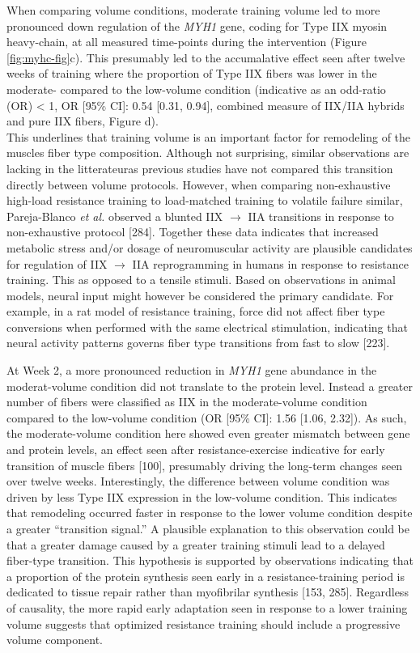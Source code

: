 \documentclass[twoside,10pt]{gihclass} %
\begin{document}
When comparing volume conditions, moderate training volume led to more pronounced down regulation of the \emph{MYH1} gene, coding for Type IIX myosin heavy-chain, at all measured time-points during the intervention (Figure \ref{fig:myhc-fig}c). This presumably led to the accumalative effect seen after twelve weeks of training where the proportion of Type IIX fibers was lower in the moderate- compared to the low-volume condition (indicative as an odd-ratio (OR) \textless{} 1, OR {[}95\% CI{]}: 0.54 {[}0.31, 0.94{]}, combined measure of IIX/IIA hybrids and pure IIX fibers, Figure d).\\
This underlines that training volume is an important factor for remodeling of the muscles fiber type composition. Although not surprising, similar observations are lacking in the litterateuras previous studies have not compared this transition directly between volume protocols.
However, when comparing non-exhaustive high-load resistance training to load-matched training to volatile failure similar, Pareja-Blanco \emph{et al.} observed a blunted IIX \(\rightarrow\) IIA transitions in response to non-exhaustive protocol
{[}284{]}.
Together these data indicates that increased metabolic stress and/or dosage of neuromuscular activity are plausible candidates for regulation of IIX \(\rightarrow\) IIA reprogramming in humans in response to resistance training.
This as opposed to a tensile stimuli.
Based on observations in animal models, neural input might however be considered the primary candidate.
For example, in a rat model of resistance training, force did not affect fiber type conversions when performed with the same electrical stimulation, indicating that neural activity patterns governs fiber type transitions from fast to slow
{[}223{]}.

At Week 2, a more pronounced reduction in \emph{MYH1} gene abundance in the moderat-volume condition did not translate to the protein level. Instead a greater number of fibers were classified as IIX in the moderate-volume condition compared to the low-volume condition (OR {[}95\% CI{]}: 1.56 {[}1.06, 2.32{]}).
As such, the moderate-volume condition here showed even greater mismatch between gene and protein levels, an effect seen after resistance-exercise indicative for early transition of muscle fibers
{[}100{]},
presumably driving the long-term changes seen over twelve weeks.
Interestingly, the difference between volume condition was driven by less Type IIX expression in the low-volume condition.
This indicates that remodeling occurred faster in response to the lower volume condition despite a greater ``transition signal.''
A plausible explanation to this observation could be that a greater damage caused by a greater training stimuli lead to a delayed fiber-type transition.
This hypothesis is supported by observations indicating that a proportion of the protein synthesis seen early in a resistance-training period is dedicated to tissue repair rather than myofibrilar synthesis
{[}153, 285{]}.
Regardless of causality, the more rapid early adaptation seen in response to a lower training volume suggests that optimized resistance training should include a progressive volume component.
\end{document}
